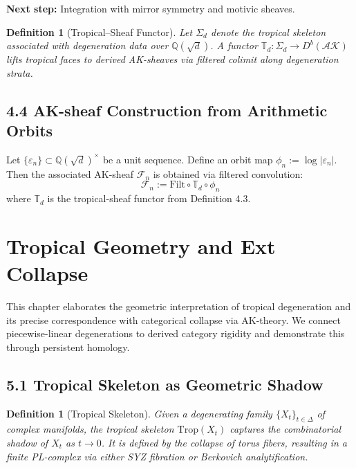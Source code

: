 \documentclass[11pt]{article}
\newtheorem{definition}[theorem]{Definition}
\begin{document}
\textbf{Next step:} Integration with mirror symmetry and motivic sheaves.

\begin{definition}[Tropical--Sheaf Functor]
Let $\Sigma_d$ denote the tropical skeleton associated with degeneration data over $\mathbb{Q}(\sqrt{d})$.
A functor $\mathbb{T}_d : \Sigma_d \to D^b(\mathcal{AK})$ lifts tropical faces to derived AK-sheaves via filtered colimit along degeneration strata.
\end{definition}

\subsection{4.4 AK-sheaf Construction from Arithmetic Orbits}

\begin{lemma}
Let $\{\varepsilon_n\} \subset \mathbb{Q}(\sqrt{d})^\times$ be a unit sequence.
Define an orbit map $\phi_n := \log|\varepsilon_n|$.
Then the associated AK-sheaf $\mathcal{F}_n$ is obtained via filtered convolution:
\[
\mathcal{F}_n := \mathrm{Filt} \circ \mathbb{T}_d \circ \phi_n
\]
where $\mathbb{T}_d$ is the tropical-sheaf functor from Definition 4.3.
\end{lemma}


\section{Tropical Geometry and Ext Collapse}

This chapter elaborates the geometric interpretation of tropical degeneration and its precise correspondence with categorical collapse via AK-theory. We connect piecewise-linear degenerations to derived category rigidity and demonstrate this through persistent homology.

\subsection{5.1 Tropical Skeleton as Geometric Shadow}

\begin{definition}[Tropical Skeleton]
Given a degenerating family $\{ X_t \}_{t \in \Delta}$ of complex manifolds, the tropical skeleton $\mathrm{Trop}(X_t)$ captures the combinatorial shadow of $X_t$ as $t \to 0$. It is defined by the collapse of torus fibers, resulting in a finite PL-complex via either SYZ fibration or Berkovich analytification.
\end{definition}
\end{document}
